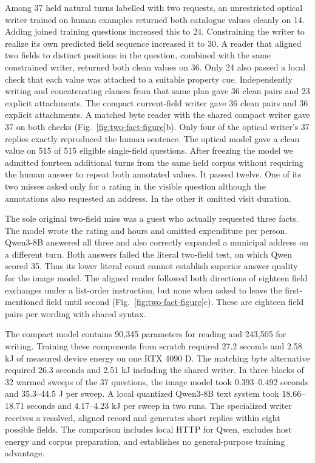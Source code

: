 \documentclass[12pt,a4paper]{article}
\providecommand{\DIFadd}[1]{{\protect\color{blue} \sf #1}} %
\begin{document}
\DIFadd{Among 37 held natural turns labelled with two requests, an unrestricted optical writer trained on human examples returned both catalogue values cleanly on 14. Adding joined training questions increased this to 24. Constraining the writer to realize its own predicted field sequence increased it to 30. A reader that aligned two fields to distinct positions in the question, combined with the same constrained writer, returned both clean values on 36. Only 24 also passed a local check that each value was attached to a suitable property cue. Independently writing and concatenating clauses from that same plan gave 36 clean pairs and 23 explicit attachments. The compact current-field writer gave 36 clean pairs and 36 explicit attachments. A matched byte reader with the shared compact writer gave 37 on both checks (Fig.~\ref{fig:two-fact-figure}b). Only four of the optical writer's 37 replies exactly reproduced the human sentence. The optical model gave a clean value on 515 of 515 eligible single-field questions. After freezing the model we admitted fourteen additional turns from the same held corpus without requiring the human answer to repeat both annotated values. It passed twelve. One of its two misses asked only for a rating in the visible question although the annotations also requested an address. In the other it omitted visit duration.
}

\DIFadd{The sole original two-field miss was a guest who actually requested three facts. The model wrote the rating and hours and omitted expenditure per person. Qwen3-8B answered all three and also correctly expanded a municipal address on a different turn. Both answers failed the literal two-field test, on which Qwen scored 35. Thus its lower literal count cannot establish superior answer quality for the image model. The aligned reader followed both directions of eighteen field exchanges under a list-order instruction, but none when asked to leave the first-mentioned field until second (Fig.~\ref{fig:two-fact-figure}c). These are eighteen field pairs per wording with shared syntax.
}

\DIFadd{The compact model contains 90,345 parameters for reading and 243,505 for writing. Training these components from scratch required 27.2 seconds and 2.58 kJ of measured device energy on one RTX 4090 D. The matching byte alternative required 26.3 seconds and 2.51 kJ including the shared writer. In three blocks of 32 warmed sweeps of the 37 questions, the image model took 0.393--0.492 seconds and 35.3--44.5 J per sweep. A local quantized Qwen3-8B text system took 18.66--18.71 seconds and 4.17--4.23 kJ per sweep in two runs. The specialized writer receives a resolved, aligned record and generates short replies within eight possible fields. The comparison includes local HTTP for Qwen, excludes host energy and corpus preparation, and establishes no general-purpose training advantage.
}
\end{document}
